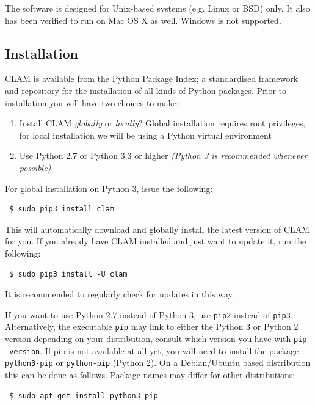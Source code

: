 \documentclass[a4paper,12pt,twoside,openright]{report}
\begin{document}
The software is designed for Unix-based systems (e.g. Linux or BSD) only. It
also has been verified to run on Mac OS X as well. Windows is not supported.

\subsection{Installation}

CLAM is available from the Python Package Index; a standardised framework and
repository for the installation of all kinds of Python packages. Prior to
installation you will have two choices to make:

\begin{enumerate}
    \item Install CLAM \emph{globally} or \emph{locally}? Global installation requires root
        privileges, for local installation we will be using a Python virtual
        environment
    \item Use Python 2.7 or Python 3.3 or higher \emph{(Python 3 is recommended whenever possible)}
\end{enumerate}

For global installation on Python 3, issue the following:

{ \small
\begin{verbatim} $ sudo pip3 install clam \end{verbatim}
}

This will automatically download and globally install the latest version of
CLAM for you. If you already have CLAM installed and just want to update it,
run the following:

{ \small
\begin{verbatim} $ sudo pip3 install -U clam \end{verbatim}
}

It is recommended to regularly check for updates in this way.

If you want to use Python 2.7 instead of Python 3, use \texttt{pip2} instead of
\texttt{pip3}.  Alternatively, the executable \texttt{pip} may link to either
the Python 3 or Python 2 version depending on your distribution, consult which
version you have with \texttt{pip --version}. If pip is not available at all
yet, you will need to install the package \texttt{python3-pip} or
\texttt{python-pip} (Python 2).  On a Debian/Ubuntu based distribution this can
be done as follows. Package names may differ for other distributions:

{ \small
\begin{verbatim} $ sudo apt-get install python3-pip \end{verbatim}
}
\end{document}
